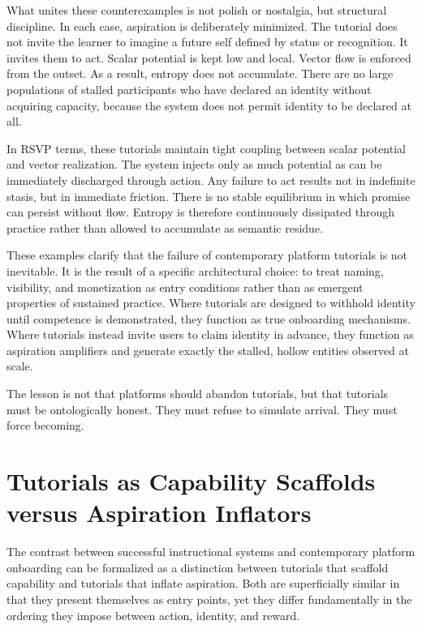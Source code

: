 \documentclass[11pt,oneside]{article}
\begin{document}
What unites these counterexamples is not polish or nostalgia, but structural discipline. In each case, aspiration is deliberately minimized. The tutorial does not invite the learner to imagine a future self defined by status or recognition. It invites them to act. Scalar potential is kept low and local. Vector flow is enforced from the outset. As a result, entropy does not accumulate. There are no large populations of stalled participants who have declared an identity without acquiring capacity, because the system does not permit identity to be declared at all.

In RSVP terms, these tutorials maintain tight coupling between scalar potential and vector realization. The system injects only as much potential as can be immediately discharged through action. Any failure to act results not in indefinite stasis, but in immediate friction. There is no stable equilibrium in which promise can persist without flow. Entropy is therefore continuously dissipated through practice rather than allowed to accumulate as semantic residue.

These examples clarify that the failure of contemporary platform tutorials is not inevitable. It is the result of a specific architectural choice: to treat naming, visibility, and monetization as entry conditions rather than as emergent properties of sustained practice. Where tutorials are designed to withhold identity until competence is demonstrated, they function as true onboarding mechanisms. Where tutorials instead invite users to claim identity in advance, they function as aspiration amplifiers and generate exactly the stalled, hollow entities observed at scale.

The lesson is not that platforms should abandon tutorials, but that tutorials must be ontologically honest. They must refuse to simulate arrival. They must force becoming.

\section{Tutorials as Capability Scaffolds versus Aspiration Inflators}

The contrast between successful instructional systems and contemporary platform onboarding can be formalized as a distinction between tutorials that scaffold capability and tutorials that inflate aspiration. Both are superficially similar in that they present themselves as entry points, yet they differ fundamentally in the ordering they impose between action, identity, and reward.
\end{document}
